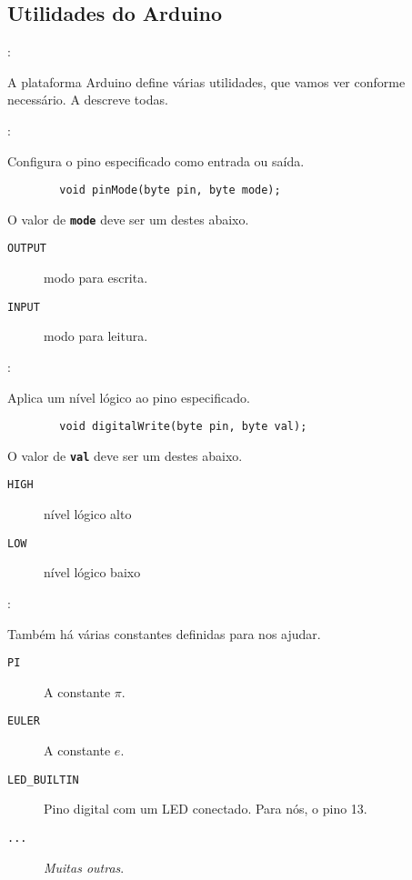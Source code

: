 \subsection{Utilidades do Arduino}


\begin{frame}{\insertsection: \insertsubsection}

	A plataforma Arduino define várias utilidades, que vamos ver conforme necessário. A  descreve todas.

\end{frame}


\begin{frame}[fragile]{\insertsection: \insertsubsection}

	Configura o pino especificado como entrada ou saída.
	\begin{verbatim}
		void pinMode(byte pin, byte mode);
	\end{verbatim}

	O valor de \texttt{\textbf{mode}} deve ser um destes abaixo.
	\begin{description}
		\item[\texttt{OUTPUT}] modo para escrita.
		\item[\texttt{INPUT}] modo para leitura.
	\end{description}

\end{frame}


\begin{frame}[fragile]{\insertsection: \insertsubsection}

	Aplica um nível lógico ao pino especificado.
	\begin{verbatim}
		void digitalWrite(byte pin, byte val);
	\end{verbatim}

	O valor de \texttt{\textbf{val}} deve ser um destes abaixo.
	\begin{description}
		\item[\texttt{HIGH}] nível lógico alto
		\item[\texttt{LOW}] nível lógico baixo
	\end{description}

\end{frame}


\begin{frame}{\insertsection: \insertsubsection}

	Também há várias constantes definidas para nos ajudar.
	\begin{description}
		\item[\texttt{PI}] A constante $\pi$.
		\item[\texttt{EULER}] A constante $e$.
		\item[\texttt{LED\_BUILTIN}] Pino digital com um LED conectado. Para nós, o pino 13.
		\item[\texttt{...}] \emph{Muitas outras}.
	\end{description}

\end{frame}


